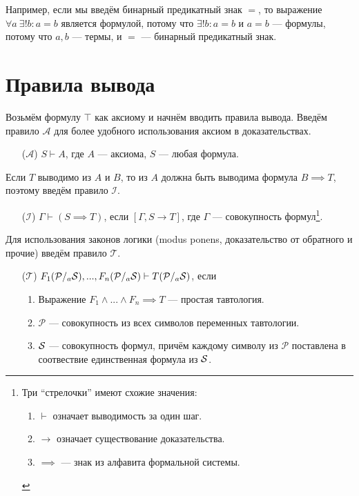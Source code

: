 Например, если мы введём бинарный предикатный знак $=$, то выражение
$\forall a~\exists!b:a=b$ является формулой, потому что ${\exists! b:a=b}$ и
${a=b}$ --- формулы, потому что $a,b$ --- термы, и $=$ --- бинарный предикатный знак.

\section{Правила вывода}

\newcommand\taut{$\mathcal T$}
\newcommand\axiom{$\mathcal A$}
\newcommand\implic{$\mathcal I$}
\newcommand\Px{\mathcal P}
Возьмём формулу $\top$ как аксиому и начнём вводить правила вывода.
Введём правило \axiom{} для более удобного использования аксиом в доказательствах.
\begin{enumerate}
	\item[(\axiom)]{}$S\vdash A$, где $A$ --- аксиома, $S$ --- любая формула.
\end{enumerate}

Если $T$ выводимо из $A$ и $B$, то из $A$ должна быть выводима формула $B\implies T$,
поэтому введём правило \implic{}.
\begin{enumerate}
	\item[(\implic)]{}${\Gamma\vdash (S\implies T)}$, если $[\Gamma,S\to T]$,
	где $\Gamma$ --- совокупность формул\footnote{
		Три ``стрелочки'' имеют схожие значения:
		\begin{enumerate}
			\item{}$\vdash$ означает выводимость за один шаг.
			\item{}$\to$ означает существование доказательства.
			\item{}$\implies$ --- знак из алфавита формальной системы.
		\end{enumerate}
	}.
\end{enumerate}

Для использования законов логики (modus ponens, доказательство от обратного и прочие)
введём правило \taut{}.
\begin{enumerate}
	\item[(\taut)]{}$F_1(\Px/_{a}\Sx),...,F_n(\Px/_{a}\Sx)\vdash T(\Px/_{a}\Sx)$,
	если
	\begin{enumerate}
		\item{}Выражение ${F_1\land...\land F_n\implies T}$ --- простая тавтология.
		\item{}$\Px$ --- совокупность из всех символов переменных тавтологии.
		\item{}$\mathcal S$ --- совокупность формул, причём каждому символу из $\Px$
		поставлена в соотвествие единственная формула из $\mathcal S$.
	\end{enumerate}
\end{enumerate}

